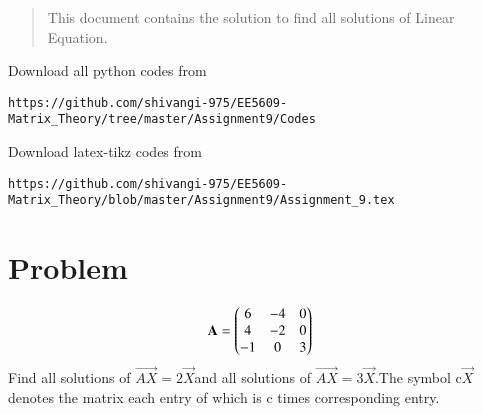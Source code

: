 \documentclass[journal,12pt,twocolumn]{IEEEtran}
\begin{document}
%
\vspace{2ex}
\begin{center}
\end{center}
\begin{abstract}
This document contains the solution to  find all solutions of Linear Equation.
\end{abstract}
Download all python codes from 
%
\begin{lstlisting}
https://github.com/shivangi-975/EE5609-Matrix_Theory/tree/master/Assignment9/Codes
\end{lstlisting}
%
Download latex-tikz codes from 
%
\begin{lstlisting}
https://github.com/shivangi-975/EE5609-Matrix_Theory/blob/master/Assignment9/Assignment_9.tex
\end{lstlisting}
%
\section{Problem}
\begin{align}
\mathbf{A}=
       \begin{pmatrix}6 & -4 & 0\\
             4& -2 & 0\\
             -1 &0 &3\end{pmatrix}
\end{align}\noindent
Find all solutions of $\vec{AX}=2\vec{X}$and all solutions of $\vec{AX}=3\vec{X}$.The symbol c$\vec{X}$ denotes the matrix each entry of which is c times corresponding entry.
%
%	
\end{document}

